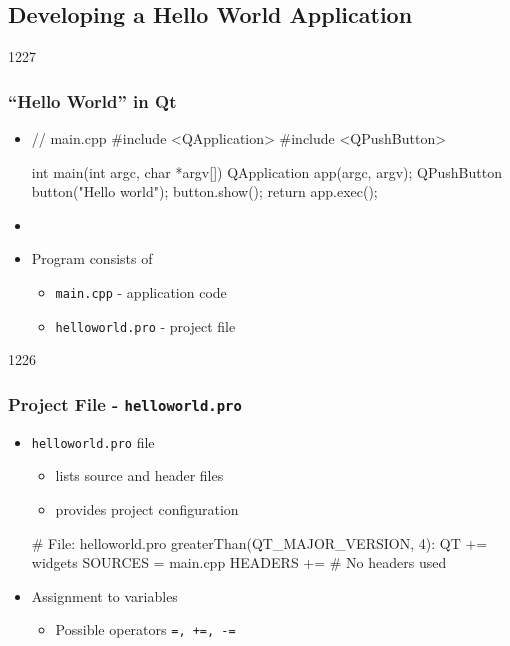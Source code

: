 %
%
%
%

\subsection{Developing a Hello World Application}

\begin{slide}[fragile]{1227}
  \frametitle{``Hello World'' in Qt}
  \medskip
  \begin{itemize}
  \item [] \begin{cpp}
// main.cpp
#include <QApplication>
#include <QPushButton>

int main(int argc, char *argv[])
{
  QApplication app(argc, argv);
  QPushButton button("Hello world");
  button.show();
  return app.exec();
}
  \end{cpp}
 \item[]
 \item Program consists of
    \begin{itemize}
    \item \texttt{main.cpp} - application code
    \item \texttt{helloworld.pro} - project file
    \end{itemize}
  \end{itemize}
\end{slide}

\begin{slide}[fragile]{1226}
\frametitle{Project File - \texttt{helloworld.pro}}
\begin{itemize}
\item \texttt{helloworld.pro} file
  \begin{itemize}
  \item lists source and header files
  \item provides project configuration
 \end{itemize}
\begin{qmake}
# File: helloworld.pro
greaterThan(QT_MAJOR_VERSION, 4): QT += widgets
SOURCES  = main.cpp
HEADERS +=          # No headers used
\end{qmake}
\item Assignment to variables
  \begin{itemize}
  \item Possible operators \texttt{=, +=, -=}
  \end{itemize}
\end{itemize}
\end{slide}

